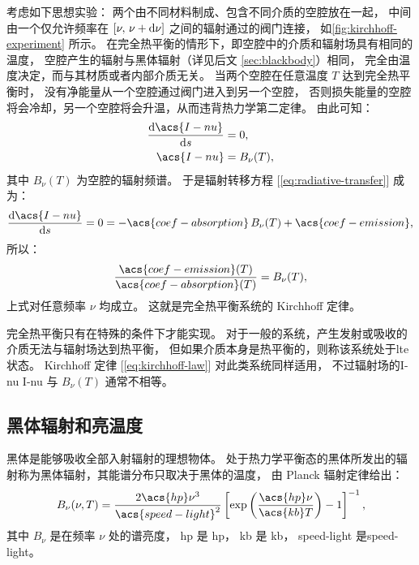 考虑如下思想实验：
两个由不同材料制成、包含不同介质的空腔放在一起，
中间由一个仅允许频率在 $[\nu, \,\nu+\mathrm{d}\nu]$ 之间的辐射通过的阀门连接，
如\autoref{fig:kirchhoff-experiment} 所示。
在完全热平衡的情形下，即空腔中的介质和辐射场具有相同的温度，
空腔产生的辐射与黑体辐射（详见后文 \autoref{sec:blackbody}）相同，
完全由温度决定，而与其材质或者内部介质无关。
当两个空腔在任意温度 $T$ 达到完全热平衡时，
没有净能量从一个空腔通过阀门进入到另一个空腔，
否则损失能量的空腔将会冷却，另一个空腔将会升温，从而违背热力学第二定律。
由此可知：
\begin{align}
  \diff{\acs{I-nu}}{s} & = 0 , \\
  \acs{I-nu} & = B_{\nu}(T) ,
\end{align}
其中 $B_{\nu}(T)$ 为空腔的辐射频谱。
于是辐射转移方程 [\autoref{eq:radiative-transfer}] 成为：
\begin{equation}
  \diff{\acs{I-nu}}{s} = 0
    = - \acs{coef-absorption} \,B_{\nu}(T) + \acs{coef-emission} ,
\end{equation}
所以：
\begin{equation}
  \label{eq:kirchhoff-law}
  \frac{\acs{coef-emission}(T)}{\acs{coef-absorption}(T)} = B_{\nu}(T) ,
\end{equation}
上式对任意频率 $\nu$ 均成立。
这就是完全热平衡系统的 Kirchhoff 定律。

完全热平衡只有在特殊的条件下才能实现。
对于一般的系统，产生发射或吸收的介质无法与辐射场达到热平衡，
但如果介质本身是热平衡的，则称该系统处于\acf{lte}状态。
Kirchhoff 定律 [\autoref{eq:kirchhoff-law}] 对此类系统同样适用，
不过辐射场的\acl{I-nu} \ac{I-nu} 与 $B_{\nu}(T)$ 通常不相等。

\subsection{黑体辐射和亮温度}
\label{sec:blackbody}

黑体是能够吸收全部入射辐射的理想物体。
处于热力学平衡态的黑体所发出的辐射称为黑体辐射，其能谱分布只取决于黑体的温度，
由 Planck 辐射定律给出：
\begin{equation}
  \label{eq:planck}
  B_{\nu}(\nu, T) = \frac{2 \acs{hp} \nu^3}{\acs{speed-light}^2}
    \left[ \exp\left( \frac{\acs{hp} \nu}{\acs{kb} T} \right) - 1 \right]^{-1} ,
\end{equation}
其中 $B_{\nu}$ 是在频率 $\nu$ 处的谱亮度，
\acs{hp} 是 \acl{hp}，
\acs{kb} 是 \acl{kb}，
\acs{speed-light} 是\acl{speed-light}。


